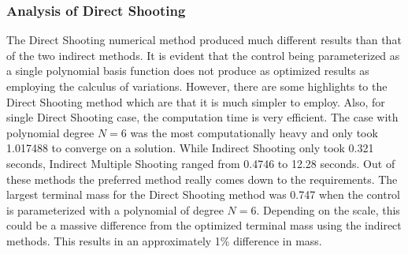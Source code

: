 \documentclass[]{article}
\begin{document}
\subsubsection{Analysis of Direct Shooting}
The Direct Shooting numerical method produced much different results than that of the two indirect methods. It is evident that the control being parameterized as a single polynomial basis function does not produce as optimized results as employing the calculus of variations. However, there are some highlights to the Direct Shooting method which are that it is much simpler to employ. Also, for single Direct Shooting case, the computation time is very efficient. The case with polynomial degree \(N = 6\) was the most computationally heavy and only took 1.017488 to converge on a solution. While Indirect Shooting only took 0.321 seconds, Indirect Multiple Shooting ranged from 0.4746 to 12.28 seconds. Out of these methods the preferred method really comes down to the requirements. The largest terminal mass for the Direct Shooting method was 0.747 when the control is parameterized with a polynomial of degree \(N = 6\). Depending on the scale, this could be a massive difference from the optimized terminal mass using the indirect methods. This results in an approximately 1\% difference in mass.
\FloatBarrier
\end{document}

